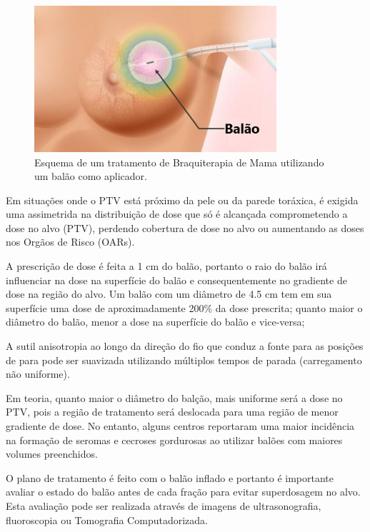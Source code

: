 \documentclass[11pt,a4paper]{article}
\begin{document}
			\begin{figure}[h]
				\centering
				\includegraphics[width=0.8\textwidth]{Imagens/esquemaBalaoMama.jpg}
				\caption{Esquema de um tratamento de Braquiterapia de Mama utilizando um balão como aplicador.}
				\label{img:esquemaBalao}
			\end{figure}


			Em situações onde o PTV está próximo da pele ou da parede toráxica, é exigida uma assimetrida na distribuição de dose que só é alcançada comprometendo a dose no alvo (PTV), perdendo cobertura de dose no alvo ou aumentando as doses nos Orgãos de Risco (OARs).


			A prescrição de dose é feita a 1 cm do balão, portanto o raio do balão irá influenciar na dose na superfície do balão e consequentemente no gradiente de dose na região do alvo. Um balão com um diâmetro de 4.5 cm tem em sua superfície uma dose de aproximadamente 200\% da dose prescrita; quanto maior o diâmetro do balão, menor a dose na superfície do balão e vice-versa;

			A sutil anisotropia ao longo da direção do fio que conduz a fonte para as posições de para pode ser suavizada utilizando múltiplos tempos de parada (carregamento não uniforme). 

			Em teoria, quanto maior o diâmetro do balção, mais uniforme será a dose no PTV, pois a região de tratamento será deslocada para uma região de menor gradiente de dose. No entanto, alguns centros reportaram uma maior incidência na formação de seromas e cecroses gordurosas ao utilizar balões com maiores volumes preenchidos.

			O plano de tratamento é feito com o balão inflado e portanto é importante avaliar o estado do balão antes de cada fração para evitar superdosagem no alvo. Esta avaliação pode ser realizada através de imagens de ultrasonografia, fluoroscopia ou Tomografia Computadorizada.
\end{document}
